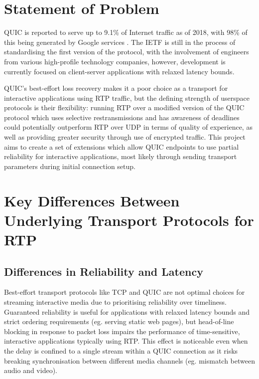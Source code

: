 \documentclass{mprop}
\begin{document}

\newpage

\section{Statement of Problem}


QUIC is reported to serve up to 9.1\% of Internet traffic as of 2018, with 98\% of this being generated by Google services \cite {Ruth2018}. The IETF is still in the process of standardising the first version of the protocol, with the involvement of engineers from various high-profile technology companies, however, development is currently focused on client-server applications with relaxed latency bounds.

QUIC's best-effort loss recovery makes it a poor choice as a transport for interactive applications using RTP traffic, but the defining strength of userspace protocols is their flexibility: running RTP over a modified version of the QUIC protocol which uses selective restransmissions and has awareness of deadlines could potentially outperform RTP over UDP in terms of quality of experience, as well as providing greater security through use of encrypted traffic. This project aims to create a set of extensions which allow QUIC endpoints to use partial reliability for interactive applications, most likely through sending transport parameters during initial connection setup.

\newpage


\section{Key Differences Between Underlying Transport Protocols for RTP}

\subsection{Differences in Reliability and Latency}

Best-effort transport protocols like TCP and QUIC are not optimal choices for streaming interactive media due to prioritising reliability over timeliness. Guaranteed reliability is useful for applications with relaxed latency bounds and strict ordering requirements (eg. serving static web pages), but head-of-line blocking in response to packet loss impairs the performance of time-sensitive, interactive applications typically using RTP. This effect is noticeable even when the delay is confined to a single stream within a QUIC connection as it risks breaking synchronisation between different media channels (eg. mismatch between audio and video).
\end{document}
